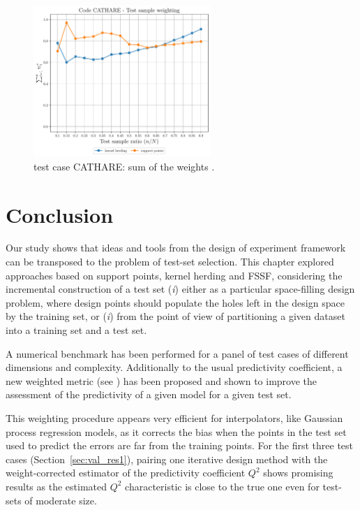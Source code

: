 \begin{figure}
  \centering
  \includegraphics[width=0.6\textwidth]{./part2/figures/SIS/cathareC2_weights.pdf}
  \caption{test case CATHARE: sum of the weights .}
  \label{fig:catharec2_weights}
\end{figure}




\section{Conclusion}\label{sec:val_conclusion}

Our study shows that ideas and tools from the design of experiment framework can be transposed to the problem of test-set selection. 
This chapter explored approaches based on support points, kernel herding and FSSF, considering the incremental construction of a test set (\textit{i}) either as a particular space-filling design problem, where design points should populate the holes left in the design space by the training set, or (\textit{i}) from the point of view of partitioning a given dataset into a training set and a test set. 

A numerical benchmark has been performed for a panel of test cases of different dimensions and complexity. 
Additionally to the usual predictivity coefficient, a new weighted metric (see \citealp{pronzato_rendas_2021}) has been proposed and shown to improve the assessment of the predictivity of a given model for a given test set. 

This weighting procedure appears very efficient for interpolators, like Gaussian process regression models, as it corrects the bias when the points in the test set used to predict the errors are far from the training points. 
For the first three test cases (Section~\ref{sec:val_res1}), pairing one iterative design method with the weight-corrected estimator of the predictivity coefficient $Q^2$ shows promising results as the estimated $Q^2$ characteristic is close to the true one even for test-sets of moderate size. 

